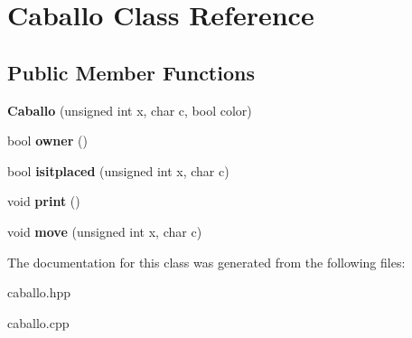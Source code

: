 \hypertarget{classCaballo}{\section{Caballo Class Reference}
\label{classCaballo}
}
\subsection*{Public Member Functions}
\begin{DoxyCompactItemize}
\item 
\hypertarget{classCaballo_a728f2fa8d6f5c2a6d4d099560fde6f82}{{\bfseries Caballo} (unsigned int x, char c, bool color)}\label{classCaballo_a728f2fa8d6f5c2a6d4d099560fde6f82}

\item 
\hypertarget{classCaballo_ab3ae1af745a6230959d992c58a659dc8}{bool {\bfseries owner} ()}\label{classCaballo_ab3ae1af745a6230959d992c58a659dc8}

\item 
\hypertarget{classCaballo_a0e745aed6acec7e42b47ccaca268dfac}{bool {\bfseries isitplaced} (unsigned int x, char c)}\label{classCaballo_a0e745aed6acec7e42b47ccaca268dfac}

\item 
\hypertarget{classCaballo_adf606aa348acb2d95461ca4b94c4c019}{void {\bfseries print} ()}\label{classCaballo_adf606aa348acb2d95461ca4b94c4c019}

\item 
\hypertarget{classCaballo_ae4df9c217afcc075ee9809e3cfffd85c}{void {\bfseries move} (unsigned int x, char c)}\label{classCaballo_ae4df9c217afcc075ee9809e3cfffd85c}

\end{DoxyCompactItemize}


The documentation for this class was generated from the following files\-:\begin{DoxyCompactItemize}
\item 
caballo.\-hpp\item 
caballo.\-cpp\end{DoxyCompactItemize}
